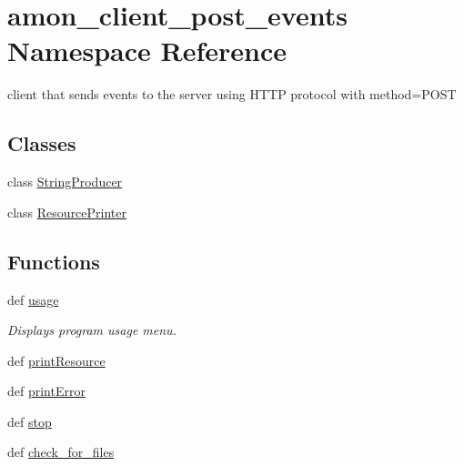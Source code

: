 \hypertarget{namespaceamon__client__post__events}{\section{amon\-\_\-client\-\_\-post\-\_\-events Namespace Reference}
\label{namespaceamon__client__post__events}
}


client that sends events to the server using H\-T\-T\-P protocol with method=P\-O\-S\-T  


\subsection*{Classes}
\begin{DoxyCompactItemize}
\item 
class \hyperlink{classamon__client__post__events_1_1_string_producer}{String\-Producer}
\item 
class \hyperlink{classamon__client__post__events_1_1_resource_printer}{Resource\-Printer}
\end{DoxyCompactItemize}
\subsection*{Functions}
\begin{DoxyCompactItemize}
\item 
def \hyperlink{namespaceamon__client__post__events_afc50fe46ea786f92db2b05adc0dcdb52}{usage}
\begin{DoxyCompactList}\small\item\em Displays program usage menu. \end{DoxyCompactList}\item 
def \hyperlink{namespaceamon__client__post__events_adf891b9502a8638c49a52f1662255e70}{print\-Resource}
\item 
def \hyperlink{namespaceamon__client__post__events_a35b30df4fe373be2f3ea9c2e70cbd2b7}{print\-Error}
\item 
def \hyperlink{namespaceamon__client__post__events_ab5e3ef35888a54a77fef20bb5524032c}{stop}
\item 
def \hyperlink{namespaceamon__client__post__events_a1c982a5e21070091bab9d892aba2532d}{check\-\_\-for\-\_\-files}
\end{DoxyCompactItemize}
